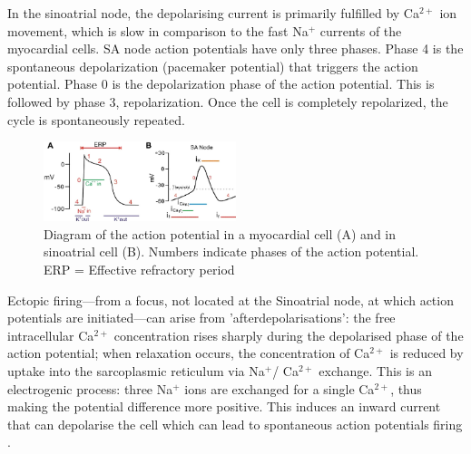 \documentclass[twocolumn, a1paper]{article}
\begin{document}




In the sinoatrial node, the depolarising current is primarily fulfilled by Ca$^{2+}$ ion movement, which is slow in comparison to the fast Na$^{+}$ currents of the myocardial cells. SA node action potentials have only three phases. Phase 4 is the spontaneous depolarization (pacemaker potential) that triggers the action potential. Phase 0 is the depolarization phase of the action potential. This is followed by phase 3, repolarization. Once the cell is completely repolarized, the cycle is spontaneously repeated.


\begin{figure}
\caption[short title]{Diagram of the action potential in a myocardial cell (A) and in sinoatrial cell (B). Numbers indicate phases of the action potential.  ERP = Effective refractory period \cite{Mizzi}}
\centering
\includegraphics[width = 0.5\textwidth]{newactionpot}
\end{figure}

Ectopic firing---from a focus, not located at the Sinoatrial node, at which action potentials are initiated---can arise from 'afterdepolarisations': the free intracellular Ca$^{2+}$ concentration rises sharply during the depolarised phase of the action potential; when relaxation occurs, the concentration of Ca$^{2+}$  is reduced by uptake into the sarcoplasmic reticulum via Na$^{+}$/ Ca$^{2+}$  exchange. This is an electrogenic process: three Na$^{+}$ ions are exchanged for a single Ca$^{2+}$, thus making the potential difference more positive. This induces an inward current that can depolarise the cell which can lead to spontaneous action potentials firing \cite{Nattel2}. 
\end{document}
